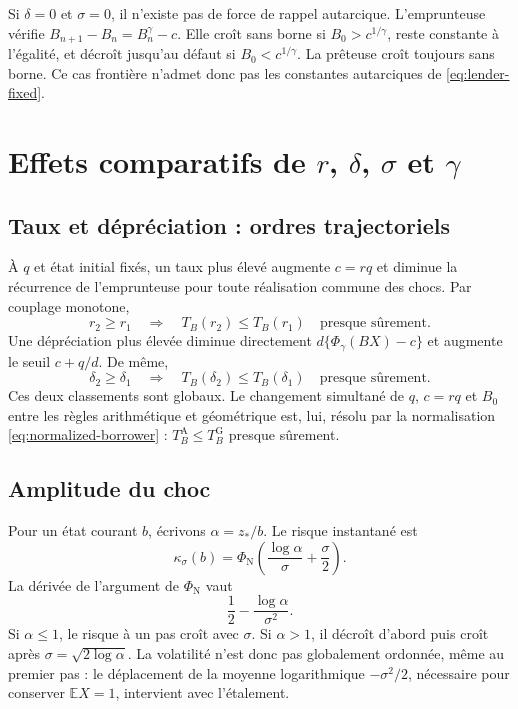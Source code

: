 \documentclass[11pt,a4paper]{article}
\newcommand{\E}{\mathbb E}
\newcommand{\1}{\mathbf 1}
\theoremstyle{definition}
\theoremstyle{remark}
\begin{document}
Si $\delta=0$ et $\sigma=0$, il n'existe pas de force de rappel
autarcique. L'emprunteuse vérifie
$B_{n+1}-B_n=B_n^\gamma-c$. Elle croît sans borne si
$B_0>c^{1/\gamma}$, reste constante à l'égalité, et décroît jusqu'au
défaut si $B_0<c^{1/\gamma}$. La prêteuse croît toujours sans borne. Ce
cas frontière n'admet donc pas les constantes autarciques de
\eqref{eq:lender-fixed}.

\section{Effets comparatifs de
\texorpdfstring{$r$, $\delta$, $\sigma$ et $\gamma$}{r, delta, sigma et gamma}}

\subsection{Taux et dépréciation : ordres trajectoriels}

À $q$ et état initial fixés, un taux plus élevé augmente $c=rq$ et diminue
la récurrence de l'emprunteuse pour toute réalisation commune des chocs.
Par couplage monotone,
\begin{equation}
r_2\geq r_1\quad\Longrightarrow\quad
T_B(r_2)\leq T_B(r_1)\quad\text{presque sûrement}.
\label{eq:r-monotone}
\end{equation}
Une dépréciation plus élevée diminue directement
$d\{\Phi_\gamma(BX)-c\}$ et augmente le seuil
$c+q/d$. De même,
\begin{equation}
\delta_2\geq\delta_1\quad\Longrightarrow\quad
T_B(\delta_2)\leq T_B(\delta_1)
\quad\text{presque sûrement}.
\label{eq:delta-monotone}
\end{equation}
Ces deux classements sont globaux. Le changement simultané de $q$,
$c=rq$ et $B_0$ entre les règles arithmétique et géométrique est, lui,
résolu par la normalisation \eqref{eq:normalized-borrower} :
$T_B^{\mathrm A}\leq T_B^{\mathrm G}$ presque sûrement.

\subsection{Amplitude du choc}

Pour un état courant $b$, écrivons $\alpha=z_*/b$. Le risque instantané
est
\begin{equation}
\kappa_\sigma(b)=
\Phi_{\mathrm N}\left(\frac{\log\alpha}{\sigma}+\frac\sigma2\right).
\label{eq:kappa-sigma}
\end{equation}
La dérivée de l'argument de $\Phi_{\mathrm N}$ vaut
\begin{equation}
\frac12-\frac{\log\alpha}{\sigma^2}.
\label{eq:sigma-derivative}
\end{equation}
Si $\alpha\leq1$, le risque à un pas croît avec $\sigma$. Si
$\alpha>1$, il décroît d'abord puis croît après
$\sigma=\sqrt{2\log\alpha}$. La volatilité n'est donc pas globalement
ordonnée, même au premier pas : le déplacement de la moyenne logarithmique
$-\sigma^2/2$, nécessaire pour conserver $\E X=1$, intervient avec
l'étalement.
\end{document}
